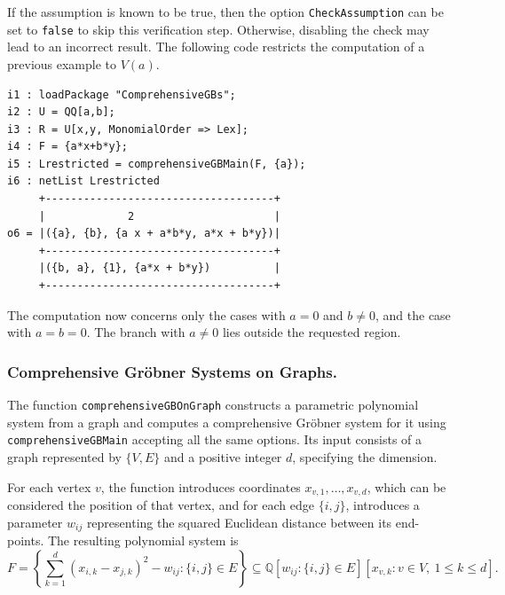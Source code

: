 \documentclass[11pt]{amsart}
\theoremstyle{plain}
\theoremstyle{definition}
\theoremstyle{remark}
\begin{document}
If the assumption is known to be true, then the option \texttt{CheckAssumption} can be set to \texttt{false} to skip this verification step. Otherwise, disabling the check may lead to an incorrect result. The following code restricts the computation of a previous example to $V(a)$.

\begin{lstlisting}
i1 : loadPackage "ComprehensiveGBs";
i2 : U = QQ[a,b];
i3 : R = U[x,y, MonomialOrder => Lex];
i4 : F = {a*x+b*y};
i5 : Lrestricted = comprehensiveGBMain(F, {a});
i6 : netList Lrestricted
     +------------------------------------+
     |             2                      |
o6 = |({a}, {b}, {a x + a*b*y, a*x + b*y})|
     +------------------------------------+
     |({b, a}, {1}, {a*x + b*y})          |
     +------------------------------------+
\end{lstlisting}
The computation now concerns only the cases with
$a=0$ and $b\neq 0$, and the case with $a=b=0$.
The branch with $a\ne 0$ lies outside the requested region.

\subsubsection{Comprehensive Gröbner Systems on Graphs.}
The function \texttt{comprehensiveGBOnGraph} constructs a
parametric polynomial system from a graph and
computes a comprehensive Gr\"obner system for it
using \texttt{comprehensiveGBMain} accepting all the same options.
Its input consists of a graph represented by
$\{V,E\}$ and a positive integer $d$, specifying
the dimension.

For each vertex $v$, the function introduces
coordinates $x_{v,1},\ldots,x_{v,d}$, which can be considered the position of that vertex, and for each
edge $\{i,j\}$, introduces a parameter $w_{ij}$ representing the squared Euclidean distance between its end-points.
The resulting polynomial system is
\[
    F=\left\{
    \sum_{k=1}^{d}(x_{i,k}-x_{j,k})^2-w_{ij}
    : \{i,j\}\in E
    \right\}
    \subseteq
    \mathbb{Q}[w_{ij}:\{i,j\}\in E]
    [x_{v,k}:v\in V,\ 1\leq k\leq d].
\]
\end{document}
